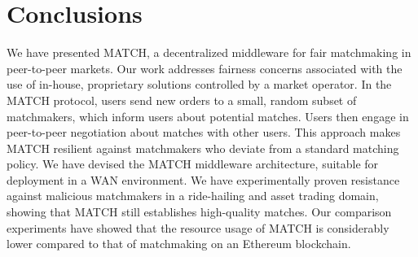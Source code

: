 \section{Conclusions}
We have presented MATCH, a decentralized middleware for fair matchmaking in peer-to-peer markets.
Our work addresses fairness concerns associated with the use of in-house, proprietary solutions controlled by a market operator.
In the MATCH protocol, users send new orders to a small, random subset of matchmakers, which inform users about potential matches.
Users then engage in peer-to-peer negotiation about matches with other users.
This approach makes MATCH resilient against matchmakers who deviate from a standard matching policy.
We have devised the MATCH middleware architecture, suitable for deployment in a WAN environment.
We have experimentally proven resistance against malicious matchmakers in a ride-hailing and asset trading domain, showing that MATCH still establishes high-quality matches.
Our comparison experiments have showed that the resource usage of MATCH is considerably lower compared to that of matchmaking on an Ethereum blockchain.
